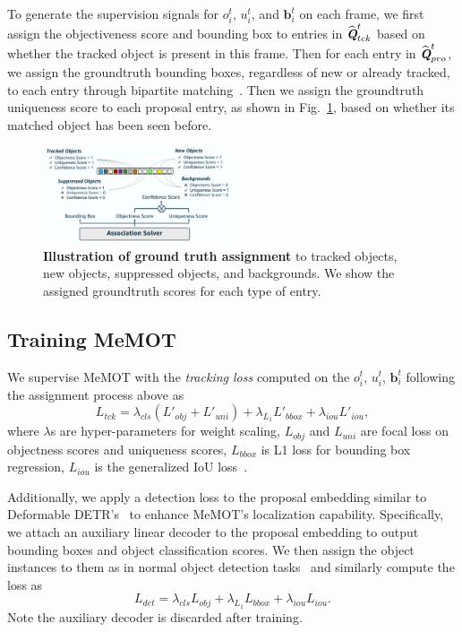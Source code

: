 To generate the supervision signals for $o_i^t$, $u_i^t$, and $\mathbf{b}_i^t$ on each frame, we first assign the objectiveness score and bounding box to entries in $\widehat{\textbf{\em Q}}^t_{tck}$ based on whether the tracked object is present in this frame. 
Then for each entry in $\widehat{\textbf{\em Q}}^t_{pro}$, we assign the groundtruth bounding boxes, regardless of new or already tracked, to each entry through bipartite matching~\cite{erhan2014scalable,carion2020end}.
Then we assign the groundtruth uniqueness score to each proposal entry, as shown in Fig.~\ref{fig:asso_solver}, based on whether its matched object has been seen before. 

\begin{figure}
    \centering
    \includegraphics[width=0.5\textwidth]{figures/asso_module.pdf}
    \vspace{-6.0mm}
    \caption{\textbf{Illustration of ground truth assignment} to tracked objects, new objects, suppressed objects, and backgrounds. We show the assigned groundtruth scores for each type of entry.}
    \label{fig:asso_solver}
    \vspace{-4.0mm}
\end{figure}

\subsection{Training MeMOT}
\label{sec:method:training}

We supervise MeMOT with the \textit{tracking loss} computed on the $o_i^t$, $u_i^t$, $\mathbf{b}_i^t$ following the assignment process above as
%
\begin{equation}
    L_{tck} = \lambda_{cls}(L'_{obj}+L'_{uni})+\lambda_{L_1}L'_{bbox}+\lambda_{iou}L'_{iou},
\end{equation}
%
where $\lambda$s are hyper-parameters for weight scaling, $L_{obj}$ and $L_{uni}$ are focal loss on objectness scores and uniqueness scores, $L_{bbox}$ is L1 loss for bounding box regression, $L_{iou}$ is the generalized IoU loss~\cite{rezatofighi2019generalized}.

Additionally, we apply a detection loss to the proposal embedding similar to Deformable DETR's~\cite{zhu2020deformable} to enhance MeMOT's localization capability.
Specifically, we attach an auxiliary linear decoder to the proposal embedding to output bounding boxes and object classification scores. We then assign the object instances to them as in normal object detection tasks~\cite{zhu2020deformable} and similarly compute the loss as
%
\begin{equation}
   L_{det} = \lambda_{cls}L_{obj}+\lambda_{L_1}L_{bbox}+\lambda_{iou}L_{iou}.
\end{equation}
%
Note the auxiliary decoder is discarded after training. 

